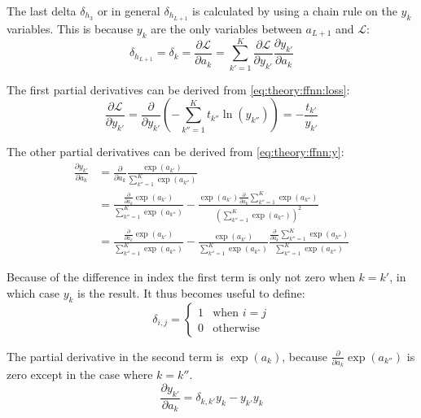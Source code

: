 The last delta $\delta_{h_3}$ or in general $\delta_{h_{L+1}}$ is calculated by using a chain rule on the $y_k$ variables. This is because $y_k$ are the only variables between $a_{L+1}$ and $\mathcal{L}$:
\begin{equation}
\delta_{h_{L + 1}} = \delta_k = \frac{\partial \mathcal{L}}{\partial a_k} = \sum_{k'=1}^K \frac{\partial \mathcal{L}}{\partial y_{k'}} \frac{\partial y_{k'}}{\partial a_k}
\label{eq:theory:ffnn:bprop-deltaK}
\end{equation}

The first partial derivatives can be derived from \eqref{eq:theory:ffnn:loss}:
\begin{equation}
\frac{\partial \mathcal{L}}{\partial y_{k'}} = \frac{\partial}{\partial y_{k'}} \left(- \sum_{k''=1}^K t_{k''} \ln(y_{k''})\right) = -\frac{t_{k'}}{y_{k'}}
\label{eq:theory:ffnn:bprop-Ldy}
\end{equation}

The other partial derivatives can be derived from \eqref{eq:theory:ffnn:y}:
\begin{equation}
\begin{aligned}
\frac{\partial y_{k'}}{\partial a_k}
&= \frac{\partial}{\partial a_k} \frac{\exp(a_{k'})}{\sum_{k''=1}^K \exp(a_{k''})} \\
&= \frac{\frac{\partial}{\partial a_k} \exp(a_{k'})}{\sum_{k''=1}^K \exp(a_{k''})}
- \frac{\exp(a_{k'}) \frac{\partial}{\partial a_k} \sum_{k''=1}^K \exp(a_{k''})}{\left(\sum_{k''=1}^K \exp(a_{k''})\right)^2} \\
&= \frac{\frac{\partial}{\partial a_k} \exp(a_{k'})}{\sum_{k''=1}^K \exp(a_{k''})}
- \frac{\exp(a_{k'})}{\sum_{k''=1}^K \exp(a_{k''})} \frac{\frac{\partial}{\partial a_k} \sum_{k''=1}^K \exp(a_{k''})}{\sum_{k''=1}^K \exp(a_{k''})}
\end{aligned}
\end{equation}

Because of the difference in index the first term is only not zero when $k = k'$, in which case $y_k$ is the result. It thus becomes useful to define:
\begin{equation}
\delta_{i,j} = \begin{cases}1& \text{when } i = j \\ 0 & \text{otherwise}\end{cases}
\end{equation}

The partial derivative in the second term is $\exp(a_k)$, because $\frac{\partial}{\partial a_k} \exp(a_{k''})$ is zero except in the case where $k = k''$.
\begin{equation}
\frac{\partial y_{k'}}{\partial a_k} = \delta_{k, k'} y_k - y_{k'} y_k
\label{eq:theory:ffnn:bprop-yda}
\end{equation}

